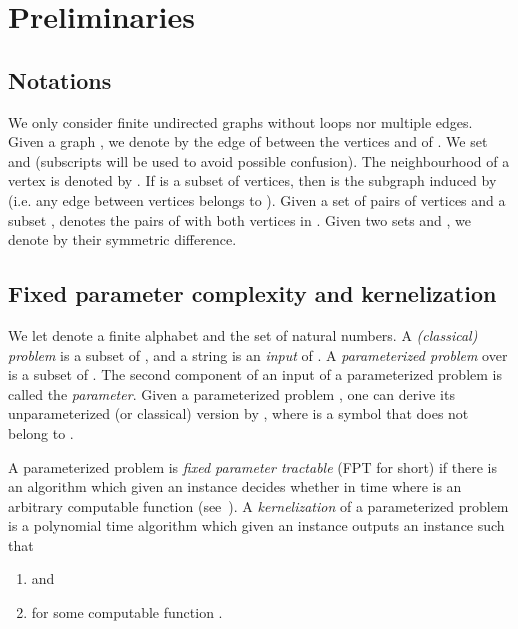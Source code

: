 \documentclass[11pt]{article}
\begin{document}
\section{Preliminaries}

\subsection{Notations} 

We only consider finite undirected graphs without loops nor multiple edges. Given a graph , we denote by  the edge of  between the vertices  and  of . We set  and  (subscripts will be used to avoid possible confusion). The neighbourhood of a vertex  is denoted by . If  is a subset of vertices, then  is the subgraph induced by  (i.e. any edge  between vertices  belongs to ). Given a set of pairs of vertices  and a subset ,  denotes the pairs of  with both vertices in . Given two sets  and , we denote by  their symmetric difference.

\subsection{Fixed parameter complexity and kernelization}

We let  denote a finite alphabet and  the set of natural numbers. A \emph{(classical) problem}  is a subset of , and a string  is an \emph{input} of . A \emph{parameterized problem}  over  is a subset of . The second component of an input  of a parameterized problem is called the \emph{parameter}. Given a parameterized problem , one can derive its unparameterized (or classical) version  by , where  is a symbol that does not belong to .

A parameterized problem   is \emph{fixed parameter tractable} (FPT for short) if there is an algorithm which given an instance  decides whether 
in time  where  is an arbitrary computable function (see~\cite{DF99,FG06,Nie06}). 
A \emph{kernelization} of a parameterized problem  is a polynomial time algorithm  which given an instance  outputs an instance  such that 
\begin{enumerate}
\item  and

\item  for some computable function .
\end{enumerate}
\end{document}
